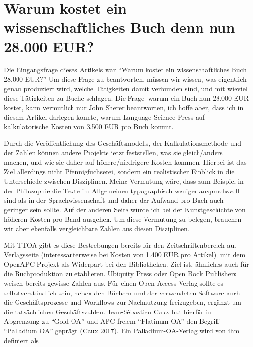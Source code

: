 \documentclass[a4paper,
fontsize=11pt,
oneside,
numbers=noperiodatend,
parskip=half-,
bibliography=totoc,
final
]{scrartcl}
\begin{document}
\hypertarget{warum-kostet-ein-wissenschaftliches-buch-denn-nun-28.000-eur}{%
\section{Warum kostet ein wissenschaftliches Buch denn nun 28.000
EUR?}\label{warum-kostet-ein-wissenschaftliches-buch-denn-nun-28.000-eur}}

Die Eingangsfrage dieses Artikels war \enquote{Warum kostet ein
wissenschaftliches Buch 28.000 EUR?} Um diese Frage zu beantworten,
müssen wir wissen, was eigentlich genau produziert wird, welche
Tätigkeiten damit verbunden sind, und mit wieviel diese Tätigkeiten zu
Buche schlagen. Die Frage, warum ein Buch nun 28.000 EUR kostet, kann
vermutlich nur John Sherer beantworten, ich hoffe aber, dass ich in
diesem Artikel darlegen konnte, warum Language Science Press auf
kalkulatorische Kosten von 3.500 EUR pro Buch kommt.

Durch die Veröffentlichung des Geschäftsmodells, der Kalkulationsmethode
und der Zahlen können andere Projekte jetzt feststellen, was sie
gleich/anders machen, und wie sie daher auf höhere/niedrigere Kosten
kommen. Hierbei ist das Ziel allerdings nicht Pfennigfuchserei, sondern
ein realistischer Einblick in die Unterschiede zwischen Disziplinen.
Meine Vermutung wäre, dass zum Beispiel in der Philosophie die Texte im
Allgemeinen typographisch weniger anspruchsvoll sind als in der
Sprachwissenschaft und daher der Aufwand pro Buch auch geringer sein
sollte. Auf der anderen Seite würde ich bei der Kunstgeschichte von
höheren Kosten pro Band ausgehen. Um diese Vermutung zu belegen,
brauchen wir aber ebenfalls vergleichbare Zahlen aus diesen Disziplinen.

Mit TTOA gibt es diese Bestrebungen bereits für den Zeitschriftenbereich
auf Verlagsseite (interessanterweise bei Kosten von 1.400 EUR pro
Artikel), mit dem OpenAPC-Projekt als Widerpart bei den Bibliotheken.
Ziel ist, ähnliches auch für die Buchproduktion zu etablieren. Ubiquity
Press oder Open Book Publishers weisen bereits gewisse Zahlen aus. Für
einen Open-Access-Verlag sollte es selbstverständlich sein, neben den
Büchern und der verwendeten Software auch die Geschäftsprozesse und
Workflows zur Nachnutzung freizugeben, ergänzt um die tatsächlichen
Geschäftszahlen. Jean-Sébastien Caux hat hierfür in Abgrenzung zu
\enquote{Gold OA} und APC-freiem \enquote{Platinum OA} den Begriff
\enquote{Palladium OA} geprägt (Caux 2017). Ein Palladium-OA-Verlag wird
von ihm definiert als
\end{document}
